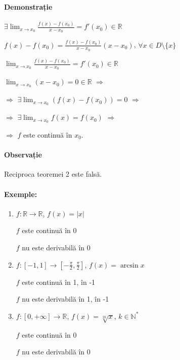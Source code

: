 \paragraph{Demonstrație}
$\exists\displaystyle\lim_{x \rightarrow x_{0}} \frac{f(x) - f(x_{0})}{x-x_{0}} = f'(x_{0}) \in \mathbb{R}$

\vspace{5pt}

$f(x) - f(x_{0}) = \frac{\displaystyle f(x) - f(x_{0})}{\displaystyle x - x_{0}} (x - x_{0})$, $\forall x \in D \setminus \{x\}$

$\displaystyle\lim_{x \rightarrow x_{0}} \frac{f(x) - f(x_{0})}{x-x_{0}} = f'(x_{0}) \in \mathbb{R}$

\vspace{5pt}

$\displaystyle\lim_{x \rightarrow x_{0}} (x - x_{0}) = 0 \in \mathbb{R}$ $\Rightarrow$

$\Rightarrow$ $\exists\displaystyle\lim_{x \rightarrow x_{0}} (f(x) - f(x_{0})) = 0$ $\Rightarrow$

$\Rightarrow$ $\exists\displaystyle\lim_{x \rightarrow x_{0}} f(x) = f(x_{0})$ $\Rightarrow$

$\Rightarrow$ $f$ este continuă în $x_{0}$.

\paragraph{Observație}
Reciproca teoremei 2 este falsă.

\paragraph{Exemple:}
\begin{enumerate}[label=\emph{\arabic*})]
	\item $f: \mathbb{R} \rightarrow \mathbb{R}$, $f(x) = \lvert x \rvert$

		$f$ este continuă în 0

		$f$ nu este derivabilă în 0

	\item $f: [-1, 1] \rightarrow [-\frac{\pi}{2}, \frac{\pi}{2}]$, $f(x) = \arcsin x$

		$f$ este continuă în 1, în -1

		$f$ nu este derivabilă în 1, în -1

	\item $f: [0, +\infty] \rightarrow \mathbb{R}$, $f(x) = \sqrt[2k]{x}$, $k \in \mathbb{N}^{*}$

		$f$ este continuă în 0

		$f$ nu este derivabilă în 0
\end{enumerate}

